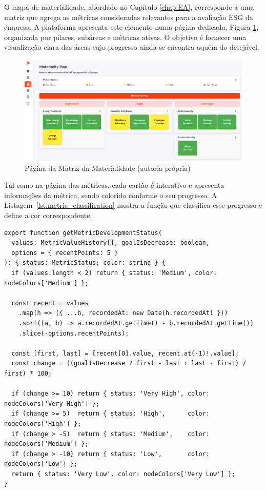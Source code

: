 O mapa de materialidade, abordado no Capítulo \ref{chap:EA}, corresponde a uma matriz que agrega as métricas consideradas relevantes para a avaliação ESG da empresa. A plataforma apresenta este elemento numa página dedicada, Figura \ref{fig:matrix_done}, organizada por pilares, subáreas e métricas ativas. O objetivo é fornecer uma visualização clara das áreas cujo progresso ainda se encontra aquém do desejável.

\begin{figure}[H]
    \centering
    \includegraphics[width=\linewidth,keepaspectratio]{frontmatter/assets/platform_prints/matrix/matrix_done.png}
    \caption{Página da Matriz da Materialidade (autoria própria)}
    \label{fig:matrix_done}
\end{figure}

Tal como na página das métricas, cada cartão é interativo e apresenta informações da métrica, sendo colorido conforme o seu progresso. A Listagem~\ref{lst:metric_classification} mostra a função que classifica esse progresso e define a cor correspondente.

\begin{lstlisting}[style=customts, caption={Classificação do progresso de uma métrica}, label={lst:metric_classification}]
export function getMetricDevelopmentStatus(
  values: MetricValueHistory[], goalIsDecrease: boolean,
  options = { recentPoints: 5 }
): { status: MetricStatus; color: string } {
  if (values.length < 2) return { status: 'Medium', color: nodeColors['Medium'] };

  const recent = values
    .map(h => ({ ...h, recordedAt: new Date(h.recordedAt) }))
    .sort((a, b) => a.recordedAt.getTime() - b.recordedAt.getTime())
    .slice(-options.recentPoints);

  const [first, last] = [recent[0].value, recent.at(-1)!.value];
  const change = ((goalIsDecrease ? first - last : last - first) / first) * 100;

  if (change >= 10) return { status: 'Very High', color: nodeColors['Very High'] };
  if (change >= 5)  return { status: 'High',      color: nodeColors['High'] };
  if (change > -5)  return { status: 'Medium',    color: nodeColors['Medium'] };
  if (change > -10) return { status: 'Low',       color: nodeColors['Low'] };
  return { status: 'Very Low', color: nodeColors['Very Low'] };
}
\end{lstlisting}

